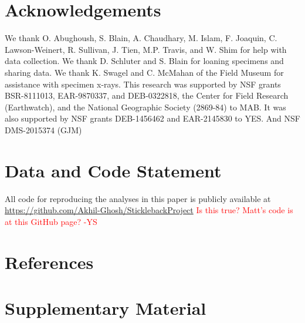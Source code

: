 \documentclass[
  12pt,
]{article}
\begin{document}
\hypertarget{sec:acknowl}{%
\section{Acknowledgements}\label{sec:acknowl}}

We thank O. Abughoush, S. Blain, A. Chaudhary, M. Islam, F. Joaquin, C.
Lawson-Weinert, R. Sullivan, J. Tien, M.P. Travis, and W. Shim for help
with data collection. We thank D. Schluter and S. Blain for loaning
specimens and sharing data. We thank K. Swagel and C. McMahan of the
Field Museum for assistance with specimen x-rays. This research was
supported by NSF grants BSR-8111013, EAR-9870337, and DEB-0322818, the
Center for Field Research (Earthwatch), and the National Geographic
Society (2869-84) to MAB. It was also supported by NSF grants
DEB-1456462 and EAR-2145830 to YES. And NSF DMS-2015374 (GJM)

\hypertarget{sec:datastatement}{%
\section{Data and Code Statement}\label{sec:datastatement}}

All code for reproducing the analyses in this paper is publicly
available at \url{https://github.com/Akhil-Ghosh/SticklebackProject}
\textcolor{red}{Is this true? Matt's code is at this GitHub page? -YS}

\hypertarget{sec:references}{%
\section{References}\label{sec:references}}

\hypertarget{sec:supplementary}{%
\section{Supplementary Material}\label{sec:supplementary}}
\end{document}
